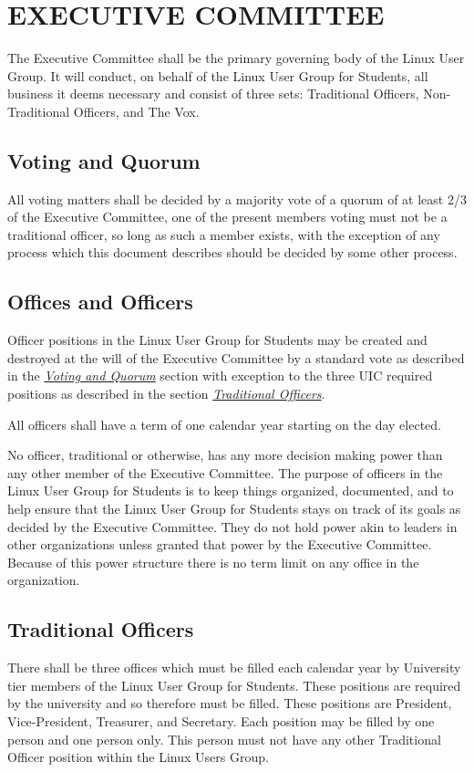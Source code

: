 \documentclass[letter]{report}
\begin{document}
\chapter{EXECUTIVE COMMITTEE}
The Executive Committee shall be the primary governing body of the Linux User
Group. It will conduct, on behalf of the Linux User Group for Students, all business it deems
necessary and consist of three sets: Traditional Officers, Non-Traditional
Officers, and The Vox.

\section{Voting and Quorum}
All voting matters shall be decided by a majority vote of a quorum of at least
2/3 of the Executive Committee, one of the present members voting must not be a
traditional officer, so long as such a member exists, with the exception of any
process which this document describes should be decided by some other process.

\section{Offices and Officers}
Officer positions in the Linux User Group for Students may be created and destroyed at the
will of the Executive Committee by a standard vote as described in the
\hyperlink{section.3.1}{\textit{Voting and Quorum}} section with exception to
the three UIC required positions as described in the section
\hyperlink{section.3.3}{\textit{Traditional Officers}}.

All officers shall have a term of one calendar year starting on the day elected.

No officer, traditional or otherwise, has any more decision making power than
any other member of the Executive Committee. The purpose of officers in the
Linux User Group for Students is to keep things organized, documented, and to help ensure
that the Linux User Group for Students stays on track of its goals as decided by the
Executive Committee. They do not hold power akin to leaders in other
organizations unless granted that power by the Executive Committee. Because of
this power structure there is no term limit on any office in the organization.

\section{Traditional Officers}
There shall be three offices which must be filled each calendar year by
University tier members of the Linux User Group for Students. These positions are required by
the university and so therefore must be filled. These positions are President,
Vice-President, Treasurer, and Secretary. Each position may be filled by one
person and one person only. This person must not have any other Traditional
Officer position within the Linux Users Group.
\end{document}
